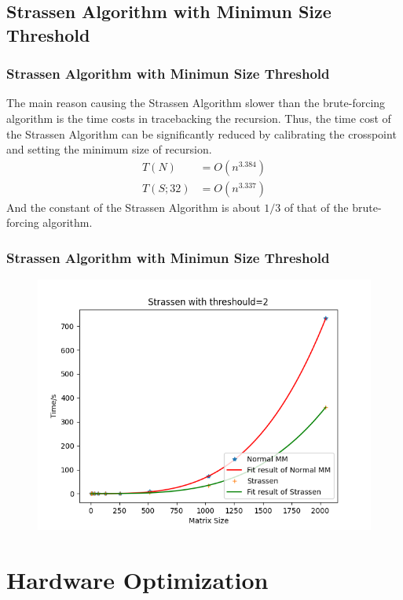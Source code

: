 \documentclass[cjk]{beamer}
\begin{document}
\subsection{Strassen Algorithm with Minimun Size Threshold}
\begin{frame}
  \frametitle{Strassen Algorithm with Minimun Size Threshold}
  The main reason causing the Strassen Algorithm slower than the brute-forcing algorithm is the time costs in tracebacking the recursion.
  Thus, the time cost of the Strassen Algorithm can be significantly reduced by calibrating the crosspoint and setting the minimum size of
  recursion.
  \begin{equation}
    \begin{aligned}
      T(N)    & =O(n^{3.384}) \\
      T(S;32) & =O(n^{3.337})
    \end{aligned}
  \end{equation}
  And the constant of the Strassen Algorithm is about \(1/3\) of that of the brute-forcing algorithm.
\end{frame}
\begin{frame}
  \frametitle{Strassen Algorithm with Minimun Size Threshold}

  \begin{figure}[htb]
    \includegraphics[width=0.9\linewidth]{th=64.png}
  \end{figure}

\end{frame}


\section{Hardware Optimization}
\end{document}
